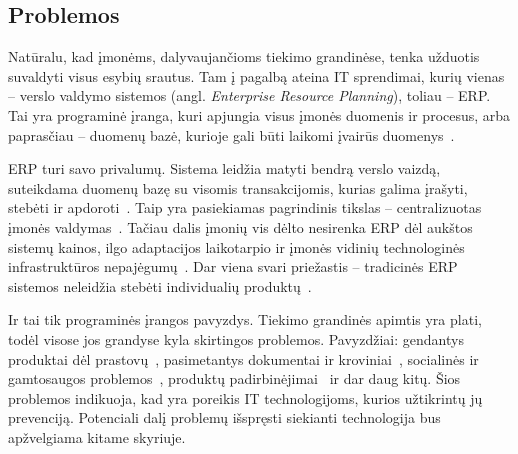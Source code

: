 
\subsection{Problemos} \label{subsection:current-problems}

Natūralu, kad įmonėms, dalyvaujančioms tiekimo grandinėse, tenka užduotis suvaldyti visus esybių srautus. Tam į pagalbą ateina IT sprendimai, kurių vienas – verslo valdymo sistemos (angl. \textit{Enterprise Resource Planning}), toliau – ERP. Tai yra programinė įranga, kuri apjungia visus įmonės duomenis ir procesus, arba paprasčiau – duomenų bazė, kurioje gali būti laikomi įvairūs duomenys~\cite{ozcan2016software}. 

ERP turi savo privalumų. Sistema leidžia matyti bendrą verslo vaizdą, suteikdama duomenų bazę su visomis transakcijomis, kurias galima įrašyti, stebėti ir apdoroti~\cite{neubert2018collaboration}. Taip yra pasiekiamas pagrindinis tikslas – centralizuotas įmonės valdymas~\cite{ozcan2016software}. Tačiau dalis įmonių vis dėlto nesirenka ERP dėl aukštos sistemų kainos, ilgo adaptacijos laikotarpio ir įmonės vidinių technologinės infrastruktūros nepajėgumų~\cite{ozcan2016software}. Dar viena svari priežastis – tradicinės ERP sistemos neleidžia stebėti individualių produktų~\cite{garg2018supply}. 

Ir tai tik programinės įrangos pavyzdys. Tiekimo grandinės apimtis yra plati, todėl visose jos grandyse kyla skirtingos problemos. Pavyzdžiai: gendantys produktai dėl prastovų~\cite{briano2010resiliency}, pasimetantys dokumentai ir kroviniai~\cite{huber2007vendor}, socialinės ir gamtosaugos problemos~\cite{mani2015supply, vachon2006extending}, produktų padirbinėjimai~\cite{huber2007vendor} ir dar daug kitų. Šios problemos indikuoja, kad yra poreikis IT technologijoms, kurios užtikrintų jų prevenciją. Potenciali dalį problemų išspręsti siekianti technologija bus apžvelgiama kitame skyriuje.